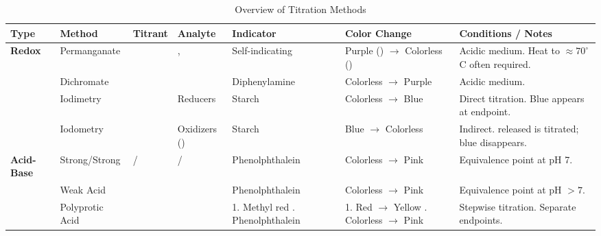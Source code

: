 \begin{table}[htbp]
    \centering
    \caption{Overview of Titration Methods}
    \small %
    \renewcommand{\arraystretch}{1.3} %
    
    \begin{tabularx}{\textwidth}{@{} L{1.7cm} L{2.2cm} L{1.4cm} L{1.8cm} L{2.4cm} L{2.8cm} Y @{}}
        \toprule
        \textbf{Type} & \textbf{Method} & \textbf{Titrant} & \textbf{Analyte} & \textbf{Indicator} & \textbf{Color Change} & \textbf{Conditions / Notes} \\
        \midrule
        
        \textbf{Redox} 
        & Permanganate &  & ,  
        & Self-indicating & Purple () $\to$ Colorless () & Acidic medium. Heat to $\approx 70^\circ$C often required. \\ 
        
        & Dichromate &  &  
        & Diphenylamine & Colorless $\to$ Purple & Acidic medium. \\ 
        
        & Iodimetry &  & Reducers & Starch & Colorless $\to$ Blue & Direct titration. Blue appears at endpoint. \\ 
        
        & Iodometry &  & Oxidizers () 
        & Starch & Blue $\to$ Colorless & Indirect.  released is titrated; blue disappears. \\ 
        \midrule
        
        \textbf{Acid-Base} 
        & Strong/Strong & / & / 
        & Phenolphthalein & Colorless $\to$ Pink & Equivalence point at pH 7. \\ 
        
        & Weak Acid &  &  
        & Phenolphthalein & Colorless $\to$ Pink & Equivalence point at pH $>7$. \\ 
        
        & Polyprotic Acid &  &  
        & 1. Methyl red . Phenolphthalein & 1. Red $\to$ Yellow . Colorless $\to$ Pink & Stepwise titration. Separate endpoints. \\ 
        

\end{tabularx}
\end{table}
